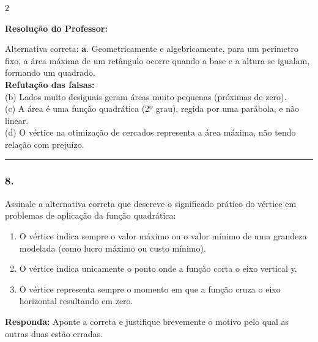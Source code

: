 \begin{multicols*}{2}
\ifgabarito
    \begin{tcolorbox}[colback=CorTitUm!5, colframe=CorTitUm, boxrule=1pt, arc=4pt, left=6pt, right=6pt, top=6pt, bottom=6pt]
    \small\textbf{\textcolor{CorTitUm}{Resolução do Professor:}}\par\vspace{0.1cm}
    \color{CinzaEscuro}
    Alternativa correta: \textbf{a}. Geometricamente e algebricamente, para um perímetro fixo, a área máxima de um retângulo ocorre quando a base e a altura se igualam, formando um quadrado. \\
    \textbf{Refutação das falsas:} \\
    (b) Lados muito desiguais geram áreas muito pequenas (próximas de zero). \\
    (c) A área é uma função quadrática (2º grau), regida por uma parábola, e não linear. \\
    (d) O vértice na otimização de cercados representa a área máxima, não tendo relação com prejuízo.
    \end{tcolorbox}
\fi

\par\vspace{\espacoQuestao}

\noindent\textcolor{CorLinha}{\rule{\linewidth}{0.5pt}} 
\par\vspace{\espacoPreQuestao}
\subsubsection*{8.} Assinale a alternativa correta que descreve o significado prático do vértice em problemas de aplicação da função quadrática:

\begin{enumerate}[label=\alph*), itemsep=\espacoAlt]
\item O vértice indica sempre o valor máximo ou o valor mínimo de uma grandeza modelada (como lucro máximo ou custo mínimo).
\item O vértice indica unicamente o ponto onde a função corta o eixo vertical y.
\item O vértice representa sempre o momento em que a função cruza o eixo horizontal resultando em zero.
\end{enumerate}

\begin{boxresponda}
\textbf{Responda:} Aponte a correta e justifique brevemente o motivo pelo qual as outras duas estão erradas.
\end{boxresponda}


\end{multicols*}
